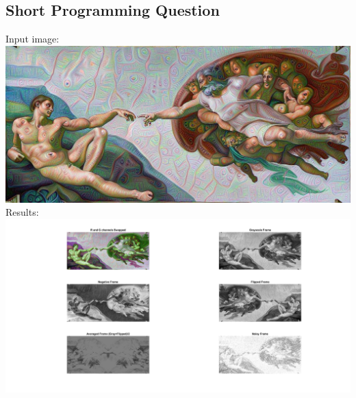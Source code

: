 \documentclass[man]{apa6}
\begin{document}
\subsection{Short Programming Question}
	Input image: \includegraphics[width=\textwidth]{plots/2/inputPS0Q2.jpg}
	Results: \includegraphics[width=\textwidth]{plots/2/subplot.png}
\end{document}
